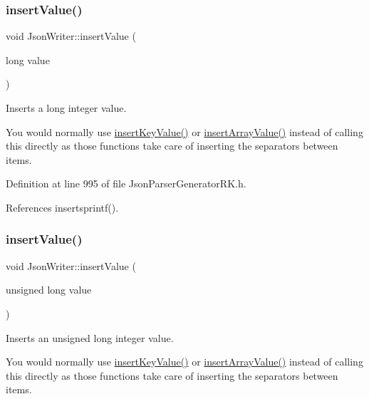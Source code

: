 \subsubsection{\texorpdfstring{insert\+Value()}{insertValue()}\hspace{0.1cm}{\footnotesize\ttfamily [4/9]}}
{\footnotesize\ttfamily void Json\+Writer\+::insert\+Value (\begin{DoxyParamCaption}\item[{long}]{value }\end{DoxyParamCaption})\hspace{0.3cm}{\ttfamily [inline]}}



Inserts a long integer value. 

You would normally use \hyperlink{class_json_writer_ac2de627389b59ce2c8ed95e10ea213bf}{insert\+Key\+Value()} or \hyperlink{class_json_writer_a8b4dc6726b66b4f277c7674e60c8a057}{insert\+Array\+Value()} instead of calling this directly as those functions take care of inserting the separators between items. 

Definition at line 995 of file Json\+Parser\+Generator\+R\+K.\+h.



References insertsprintf().

\mbox{\label{class_json_writer_a69d2d9ed9023105c3f84ce645919502b}} 
\subsubsection{\texorpdfstring{insert\+Value()}{insertValue()}\hspace{0.1cm}{\footnotesize\ttfamily [5/9]}}
{\footnotesize\ttfamily void Json\+Writer\+::insert\+Value (\begin{DoxyParamCaption}\item[{unsigned long}]{value }\end{DoxyParamCaption})\hspace{0.3cm}{\ttfamily [inline]}}



Inserts an unsigned long integer value. 

You would normally use \hyperlink{class_json_writer_ac2de627389b59ce2c8ed95e10ea213bf}{insert\+Key\+Value()} or \hyperlink{class_json_writer_a8b4dc6726b66b4f277c7674e60c8a057}{insert\+Array\+Value()} instead of calling this directly as those functions take care of inserting the separators between items. 


